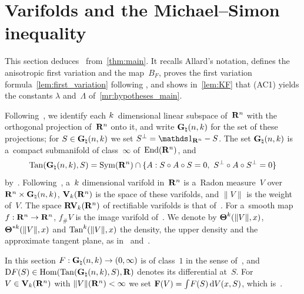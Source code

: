 \documentclass[a4paper,twoside,leqno]{article}
\begin{document}
\section{Varifolds and the Michael--Simon inequality}
\label{sec:varifolds}

\begin{miniremark}
    \label{mr:sec_varifolds}
    This section deduces~\cite[Theorem~1.6]{DePhilippisGennaioliPigatiRindler2026}
    from~\ref{thm:main}. It recalls Allard's notation, defines the anisotropic first variation
    and the map~$B_F$, proves the first variation formula~\ref{lem:first_variation} following
    \cite[Lemma~A.2]{DePhilippis2018}, and shows in~\ref{lem:KF} that (AC1) yields the
    constants $\lambda$ and~$\Lambda$ of~\ref{mr:hypotheses_main}.
\end{miniremark}

\begin{miniremark}
    \label{mr:varifolds}
    Following~\cite[2.3]{Allard1972}, we identify each $k$~dimensional linear subspace
    of~$\mathbf{R}^{n}$ with the orthogonal projection of~$\mathbf{R}^{n}$ onto it, and write
    $\mathbf{G}_{\natural}(n,k)$ for the set of these projections; for $S \in \mathbf{G}_{\natural}(n,k)$ we
    set $S^\perp = \id{\R^{\adim}} - S$. The set $\mathbf{G}_{\natural}(n,k)$ is a~compact submanifold
    of class~$\infty$ of~$\mathrm{End}({\mathbf{R}^{n}})$, and
    \begin{displaymath}
        \operatorname{Tan}(\mathbf{G}_{\natural}(n,k),S) = \mathrm{Sym}({\mathbf{R}^{n}}) \cap \{ A : S \circ A \circ S = 0,\
        S^\perp \circ A \circ S^\perp = 0 \}
    \end{displaymath}
    by~\cite[Appendix~A]{DePhilippis2018}. Following~\cite[3.1]{Allard1972}, a~$k$
    dimensional varifold in~$\mathbf{R}^{n}$ is a~Radon measure~$V$ over $\mathbf{R}^{n} \times
    \mathbf{G}_{\natural}(n,k)$, $\mathbf{V}_{k}(\mathbf{R}^{n})$ is the space of these varifolds, and
    $\|V\|$ is the weight of~$V$. The space $\mathbf{RV}_{k}(\mathbf{R}^{n})$ of rectifiable varifolds is
    that of~\cite[3.5]{Allard1972}. For a~smooth map $f : \mathbf{R}^{n} \to \mathbf{R}^{n}$, $f_\# V$ is
    the image varifold of~\cite[3.2(1)]{Allard1972}. We denote by $\boldsymbol{\Theta}^{k}(\|V\|,x)$,
    $\boldsymbol{\Theta}^{*k}(\|V\|,x)$ and $\operatorname{Tan}^{k}(\|V\|,x)$ the density, the upper density and
    the approximate tangent plane, as in~\cite[2.10.19]{Federer1969} and~\cite[3.5]{Allard1972}.

    In this section $F : \mathbf{G}_{\natural}(n,k) \to (0,\infty)$ is of class~$1$
    in the sense of~\cite[3.1.22]{Federer1969}, and $\mathrm{D} F(S) \in
    \operatorname{Hom}(\operatorname{Tan}(\mathbf{G}_{\natural}(n,k),S),\mathbf{R})$ denotes its differential at~$S$. For $V \in
    \mathbf{V}_{k}(\mathbf{R}^{n})$ with $\|V\|(\mathbf{R}^{n}) < \infty$ we set $\mathbf{F}(V) =
    {\textstyle\int_{}^{}} F(S) \,\mathrm{d} V(x,S)$, which is~\cite[(1.3)]{DePhilippisGennaioliPigatiRindler2026}.
\end{miniremark}
\end{document}
